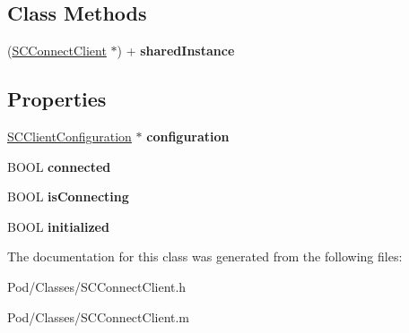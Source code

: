 \subsection*{Class Methods}
\begin{DoxyCompactItemize}
\item 
(\hyperlink{interface_s_c_connect_client}{S\+C\+Connect\+Client} $\ast$) + {\bfseries shared\+Instance}\hypertarget{interface_s_c_connect_client_a270d436a765e0bc099b27161684249d2}{}\label{interface_s_c_connect_client_a270d436a765e0bc099b27161684249d2}

\end{DoxyCompactItemize}
\subsection*{Properties}
\begin{DoxyCompactItemize}
\item 
\hyperlink{interface_s_c_client_configuration}{S\+C\+Client\+Configuration} $\ast$ {\bfseries configuration}\hypertarget{interface_s_c_connect_client_a754007a43556d696c52d8fcb135e34ac}{}\label{interface_s_c_connect_client_a754007a43556d696c52d8fcb135e34ac}

\item 
B\+O\+OL {\bfseries connected}\hypertarget{interface_s_c_connect_client_a143d4f802da5d9c77b5cf164410a8a43}{}\label{interface_s_c_connect_client_a143d4f802da5d9c77b5cf164410a8a43}

\item 
B\+O\+OL {\bfseries is\+Connecting}\hypertarget{interface_s_c_connect_client_ab60f095e9dda768471b8fdb5724f8c50}{}\label{interface_s_c_connect_client_ab60f095e9dda768471b8fdb5724f8c50}

\item 
B\+O\+OL {\bfseries initialized}\hypertarget{interface_s_c_connect_client_a19de23aa955289fa89e86fa0f77b6ef6}{}\label{interface_s_c_connect_client_a19de23aa955289fa89e86fa0f77b6ef6}

\end{DoxyCompactItemize}


The documentation for this class was generated from the following files\+:\begin{DoxyCompactItemize}
\item 
Pod/\+Classes/S\+C\+Connect\+Client.\+h\item 
Pod/\+Classes/S\+C\+Connect\+Client.\+m\end{DoxyCompactItemize}
